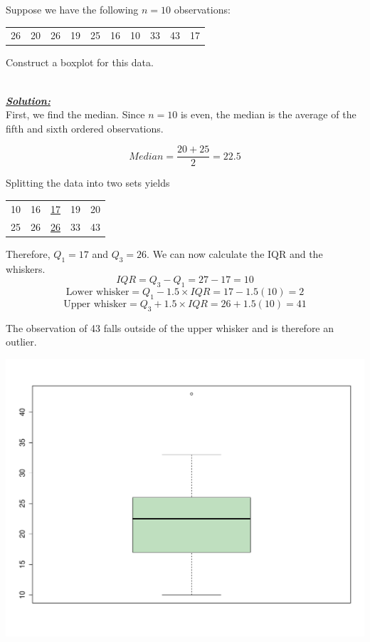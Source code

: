 \begin{example}
Suppose we have the following $n=10$ observations:
\begin{center}
\begin{tabular}{cccccccccc}
26 & 20 & 26 & 19 & 25 & 16 & 10 & 33 & 43 & 17
\end{tabular} 
\end{center}

\noindent
Construct a boxplot for this data.

\hfill\\
{\emph{\textbf{\underline{Solution:}}}}\\

\noindent
First, we find the median. Since $n=10$ is even, the median is the average of the fifth and sixth ordered observations. 

\[Median = \frac{20+25}{2} = 22.5\]

\noindent
Splitting the data into two sets yields

\begin{center}
\def\arraystretch{1.5}
\begin{tabular}{ccccc}
10 & 16 & \underline{17} & 19 & 20 \\  
25 & 26 & \underline{26} & 33 & 43 \\ 
\end{tabular} 
\end{center}

Therefore, $Q_1=17$ and $Q_3=26$. We can now calculate the IQR and the whiskers.
\[ IQR = Q_3-Q_1 =27-17=10\]
\[ \text{Lower whisker} = Q_1-1.5 \times IQR = 17 - 1.5(10) =  2 \]
\[ \text{Upper whisker} = Q_3+1.5 \times IQR = 26 + 1.5(10) = 41 \]

The observation of 43 falls outside of the upper whisker and is therefore an outlier. 

\begin{center}
\includegraphics[scale=0.25]{Section2/boxplotex.pdf}
\end{center}


\end{example}

